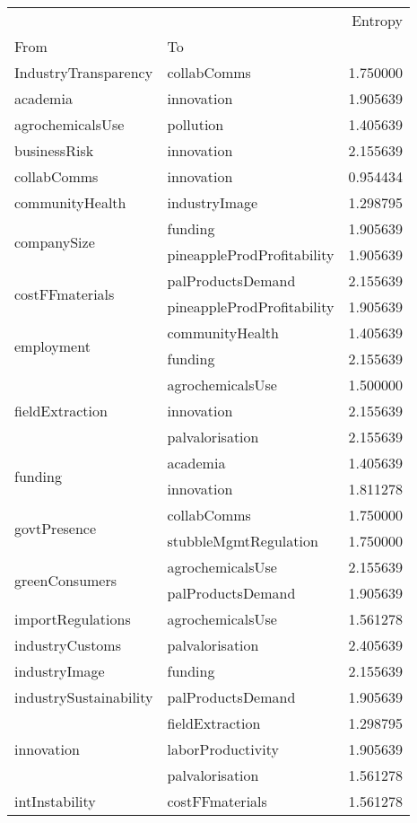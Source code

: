 \begin{tabular}{llr}
 &  & Entropy \\
From & To &  \\
IndustryTransparency & collabComms & 1.750000 \\
academia & innovation & 1.905639 \\
agrochemicalsUse & pollution & 1.405639 \\
businessRisk & innovation & 2.155639 \\
collabComms & innovation & 0.954434 \\
communityHealth & industryImage & 1.298795 \\
\multirow[c]{2}{*}{companySize} & funding & 1.905639 \\
 & pineappleProdProfitability & 1.905639 \\
\multirow[c]{2}{*}{costFFmaterials} & palProductsDemand & 2.155639 \\
 & pineappleProdProfitability & 1.905639 \\
\multirow[c]{2}{*}{employment} & communityHealth & 1.405639 \\
 & funding & 2.155639 \\
\multirow[c]{3}{*}{fieldExtraction} & agrochemicalsUse & 1.500000 \\
 & innovation & 2.155639 \\
 & palvalorisation & 2.155639 \\
\multirow[c]{2}{*}{funding} & academia & 1.405639 \\
 & innovation & 1.811278 \\
\multirow[c]{2}{*}{govtPresence} & collabComms & 1.750000 \\
 & stubbleMgmtRegulation & 1.750000 \\
\multirow[c]{2}{*}{greenConsumers} & agrochemicalsUse & 2.155639 \\
 & palProductsDemand & 1.905639 \\
importRegulations & agrochemicalsUse & 1.561278 \\
industryCustoms & palvalorisation & 2.405639 \\
industryImage & funding & 2.155639 \\
industrySustainability & palProductsDemand & 1.905639 \\
\multirow[c]{3}{*}{innovation} & fieldExtraction & 1.298795 \\
 & laborProductivity & 1.905639 \\
 & palvalorisation & 1.561278 \\
intInstability & costFFmaterials & 1.561278 \\

\end{tabular}
